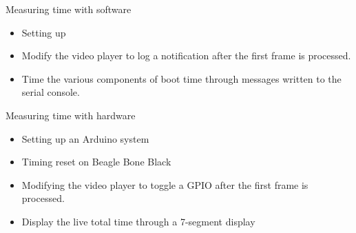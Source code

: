 {
Measuring time with software
\begin{itemize}
\item Setting up 
\item Modify the video player to log a notification
      after the first frame is processed.
\item Time the various components of boot time through messages
      written to the serial console.
\end{itemize}

Measuring time with hardware
\begin{itemize}
\item Setting up an Arduino system
\item Timing reset on Beagle Bone Black
\item Modifying the video player to toggle a GPIO
      after the first frame is processed.
\item Display the live total time through a 7-segment display
\end{itemize}
}
